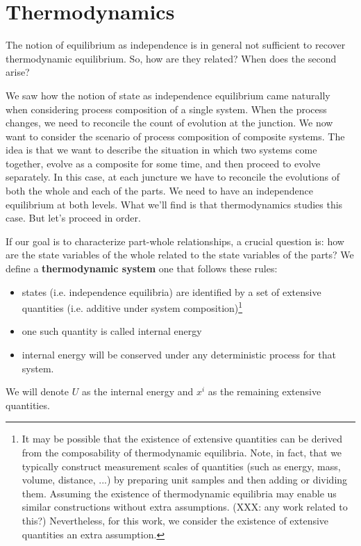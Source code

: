 \documentclass[letterpaper,twocolumn]{article}
\begin{document}
\section{Thermodynamics}

The notion of equilibrium as independence is in general not sufficient to recover thermodynamic equilibrium. So, how are they related? When does the second arise?

We saw how the notion of state as independence equilibrium came naturally when considering process composition of a single system. When the process changes, we need to reconcile the count of evolution at the junction. We now want to consider the scenario of process composition of composite systems. The idea is that we want to describe the situation in which two systems come together, evolve as a composite for some time, and then proceed to evolve separately. In this case, at each juncture we have to reconcile the evolutions of both the whole and each of the parts. We need to have an independence equilibrium at both levels. What we'll find is that thermodynamics studies this case. But let's proceed in order.

If our goal is to characterize part-whole relationships, a crucial question is: how are the state variables of the whole related to the state variables of the parts? We define a \textbf{thermodynamic system} one that follows these rules: 
\begin{itemize}
	\item states (i.e. independence equilibria) are identified by a set of extensive quantities (i.e. additive under system composition)\footnote{It may be possible that the existence of extensive quantities can be derived from the composability of thermodynamic equilibria. Note, in fact, that we typically construct measurement scales of quantities (such as energy, mass, volume, distance, ...) by preparing unit samples and then adding or dividing them. Assuming the existence of thermodynamic equilibria may enable us similar constructions without extra assumptions. (XXX: any work related to this?) Nevertheless, for this work, we consider the existence of extensive quantities an extra assumption.
	}
	\item one such quantity is called internal energy
	\item internal energy will be conserved under any deterministic process for that system.
\end{itemize}
We will denote $U$ as the internal energy and $x^i$ as the remaining extensive quantities.
\end{document}
